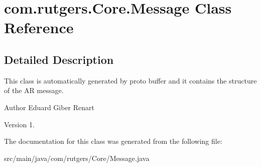 \hypertarget{classcom_1_1rutgers_1_1Core_1_1Message}{}\section{com.\+rutgers.\+Core.\+Message Class Reference}
\label{classcom_1_1rutgers_1_1Core_1_1Message}


\subsection{Detailed Description}
This class is automatically generated by proto buffer and it contains the structure of the AR message.

\begin{DoxyAuthor}{Author}
Eduard Giber Renart 
\end{DoxyAuthor}
\begin{DoxyVersion}{Version}
1. 
\end{DoxyVersion}


The documentation for this class was generated from the following file\+:\begin{DoxyCompactItemize}
\item 
src/main/java/com/rutgers/\+Core/Message.\+java\end{DoxyCompactItemize}
